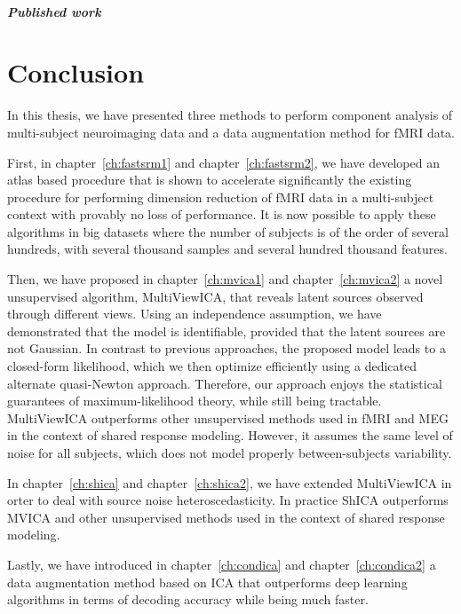 \documentclass[ twoside,openright,titlepage,numbers=noenddot,%
                headinclude,footinclude,cleardoublepage=empty,abstract=on,
                BCOR=5mm,paper=a4,fontsize=11pt, 
                ]{scrreprt}
\begin{document}
\paragraph{Published work}

\chapter{Conclusion}
In this thesis, we have presented three methods to perform component
analysis of multi-subject neuroimaging data and a data augmentation method for
fMRI data.

First, in chapter~\ref{ch:fastsrm1} and chapter~\ref{ch:fastsrm2}, we have developed an
atlas based procedure that is shown to accelerate significantly the existing
procedure for performing dimension reduction of fMRI data in a multi-subject
context with provably no loss of performance. It is now possible to apply these
algorithms in big datasets where the number of subjects is of the order of
several hundreds, with several thousand samples and several hundred thousand features.

Then, we have proposed in chapter~\ref{ch:mvica1} and chapter~\ref{ch:mvica2}
a novel unsupervised algorithm, MultiViewICA, that reveals latent sources observed through different views. Using an independence assumption, we have demonstrated that the model is identifiable, provided that the latent
sources are not Gaussian. In contrast to previous approaches, the proposed model leads to a closed-form likelihood, which we then optimize efficiently using a dedicated alternate quasi-Newton approach.
Therefore, our approach enjoys the statistical guarantees of maximum-likelihood
theory, while still being tractable. MultiViewICA outperforms other unsupervised
methods used in fMRI and MEG in the context of shared response modeling. However,
it assumes the same level of noise for all
subjects, which does not model properly between-subjects variability.

In chapter~\ref{ch:shica} and chapter~\ref{ch:shica2}, we have extended MultiViewICA in orter to deal with source noise heteroscedasticity.
In practice ShICA outperforms MVICA and other unsupervised methods used in the
context of shared response modeling.

Lastly, we have introduced in chapter~\ref{ch:condica} and chapter~\ref{ch:condica2} a data
augmentation method based on ICA that outperforms deep learning algorithms in
terms of decoding accuracy while being much faster.
\end{document}

